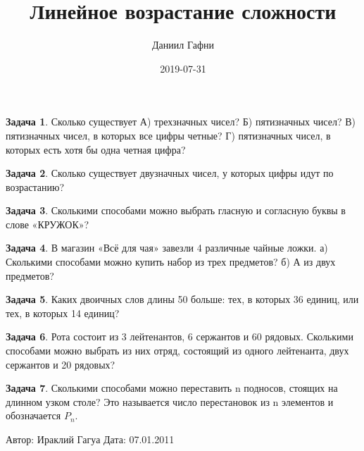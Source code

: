 \documentclass[a4paper,11pt]{article}%
\title{Линейное возрастание сложности}%
\author{Даниил Гафни}%
\date{2019{-}07{-}31}%
\theoremstyle{definition}%
\newtheorem{Ex}{\hspace{-25pt}\fbox{\phantom{123}} Задача}%
\begin{document}
%
\normalsize%
\maketitle%
\begin{Ex}%
Сколько существует
А) трехзначных чисел?
Б) пятизначных чисел?
В) пятизначных чисел, в которых все цифры четные?
Г) пятизначных чисел, в которых есть хотя бы одна четная цифра?%
%
\end{Ex}%
%
\iffalse%
Автор: Ираклий Гагуа%
Дата: 07.01.2011%
Название: None%
Подсказка: \textbackslash{}\textbackslash{}%
nan%
\fi%
%
\begin{Ex}%
Сколько существует двузначных чисел, у которых цифры идут по возрастанию?%
%
\end{Ex}%
%
\iffalse%
Автор: Ираклий Гагуа%
Дата: 07.01.2011%
Название: None%
Подсказка: \textbackslash{}\textbackslash{}%
nan%
\fi%
%
\begin{Ex}%
Сколькими способами можно выбрать гласную и согласную буквы в слове «КРУЖОК»?%
%
\end{Ex}%
%
\iffalse%
Автор: Ираклий Гагуа%
Дата: 07.01.2011%
Название: None%
Подсказка: \textbackslash{}\textbackslash{}%
nan%
\fi%
%
\begin{Ex}%
В магазин «Всё для чая» завезли 4 различные чайные ложки.
а) Сколькими способами можно купить набор из трех предметов?
б) А из двух предметов?%
%
\end{Ex}%
%
\iffalse%
Автор: Ираклий Гагуа%
Дата: 07.01.2011%
Название: None%
Подсказка: \textbackslash{}\textbackslash{}%
nan%
\fi%
%
\begin{Ex}%
Каких двоичных слов длины 50 больше: тех, в которых 36 единиц, или тех, в которых 14 единиц?%
%
\end{Ex}%
%
\iffalse%
Автор: Ираклий Гагуа%
Дата: 07.01.2011%
Название: None%
Подсказка: \textbackslash{}\textbackslash{}%
nan%
\fi%
%
\begin{Ex}%
Рота состоит из 3 лейтенантов, 6 сержантов и 60 рядовых. Сколькими способами
можно выбрать из них отряд, состоящий из одного лейтенанта, двух сержантов и 20
рядовых?%
%
\end{Ex}%
%
\iffalse%
Автор: 25 школа%
Дата: 01.07.2017%
Название: None%
Подсказка: \textbackslash{}\textbackslash{}%
nan%
\fi%
%
\begin{Ex}%
Сколькими способами можно переставить n подносов, стоящих на длинном узком столе? Это называется число перестановок из n элементов и обозначается $P_n$.%
%
\end{Ex}%
%
\iffalse%
Автор: Ираклий Гагуа%
Дата: 07.01.2011%
\end{document}
